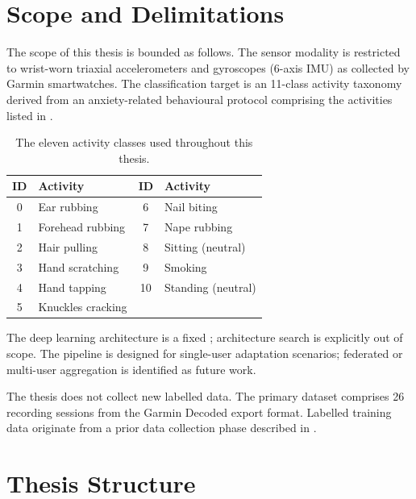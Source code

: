 \section{Scope and Delimitations}
\label{sec:scope}

The scope of this thesis is bounded as follows.
The sensor modality is restricted to wrist-worn triaxial accelerometers and
gyroscopes (6-axis IMU) as collected by Garmin smartwatches.
The classification target is an 11-class activity taxonomy derived from an
anxiety-related behavioural protocol comprising the activities listed in
.

\begin{table}[ht]
  \centering
  \caption{The eleven activity classes used throughout this thesis.}
  \label{tab:activity_classes}
  \begin{tabular}{clcl}
    \toprule
    \textbf{ID} & \textbf{Activity} & \textbf{ID} & \textbf{Activity} \\
    \midrule
    0  & Ear rubbing        & 6  & Nail biting        \\
    1  & Forehead rubbing   & 7  & Nape rubbing       \\
    2  & Hair pulling       & 8  & Sitting (neutral)  \\
    3  & Hand scratching    & 9  & Smoking            \\
    4  & Hand tapping       & 10 & Standing (neutral) \\
    5  & Knuckles cracking  &    &                    \\
    \bottomrule
  \end{tabular}
\end{table}

The deep learning architecture is a fixed \cnnbilstm{}; architecture search
is explicitly out of scope.
The pipeline is designed for single-user adaptation scenarios; federated or
multi-user aggregation is identified as future work.

The thesis does not collect new labelled data.
The primary dataset comprises 26 recording sessions from the Garmin Decoded
export format.
Labelled training data originate from a prior data collection phase described
in .

\section{Thesis Structure}
\label{sec:structure}

